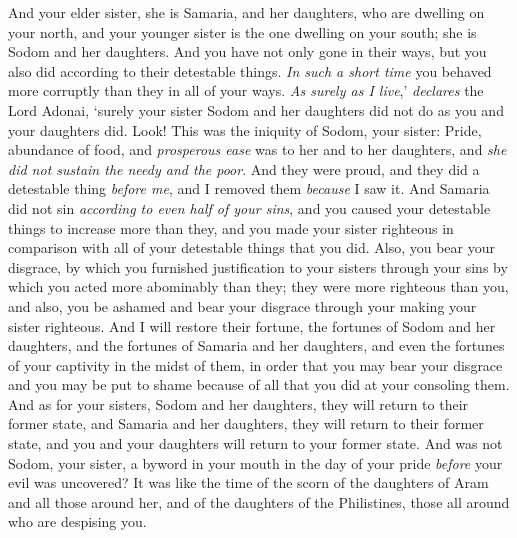 \begin{biblechapter}
\verse And your elder sister, she is Samaria, and her daughters, who are dwelling on your north, and your younger sister is the one dwelling on your south; she is Sodom and her daughters.
\verse And you have not only gone in their ways, but you also did according to their detestable things. \textit{In such a short time} you behaved more corruptly than they in all of your ways.
\verse \textit{As surely as I live},’ \textit{declares} the Lord Adonai, ‘surely your sister Sodom and her daughters did not do as you and your daughters did.
\verse Look! This was the iniquity of Sodom, your sister: Pride, abundance of food, and \textit{prosperous ease} was to her and to her daughters, and \textit{she did not sustain the needy and the poor}.
\verse And they were proud, and they did a detestable thing \textit{before me}, and I removed them \textit{because} I saw it.
\verse And Samaria did not sin \textit{according to even half of your sins}, and you caused your detestable things to increase more than they, and you made your sister righteous in comparison with all of your detestable things that you did.
\verse Also, you bear your disgrace, by which you furnished justification to your sisters through your sins by which you acted more abominably than they; they were more righteous than you, and also, you be ashamed and bear your disgrace through your making your sister righteous.
\verse And I will restore their fortune, the fortunes of Sodom and her daughters, and the fortunes of Samaria and her daughters, and even the fortunes of your captivity in the midst of them,
\verse in order that you may bear your disgrace and you may be put to shame because of all that you did at your consoling them.
\verse And as for your sisters, Sodom and her daughters, they will return to their former state, and Samaria and her daughters, they will return to their former state, and you and your daughters will return to your former state.
\verse And was not Sodom, your sister, a byword in your mouth in the day of your pride
\verse \textit{before} your evil was uncovered? It was like the time of the scorn of the daughters of Aram and all those around her, and of the daughters of the Philistines, those all around who are despising you.

\end{biblechapter}

